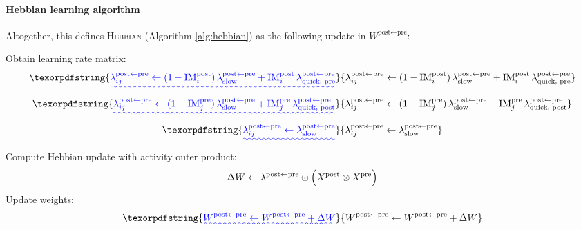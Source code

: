 \documentclass{article}
\providecommand{\DIFaddtex}[1]{{\protect\color{blue}\uwave{#1}}} %
\providecommand{\DIFaddbegin}{} %
\providecommand{\DIFaddend}{} %
\providecommand{\DIFadd}[1]{\texorpdfstring{\DIFaddtex{#1}}{#1}} %
\begin{document}
\paragraph*{Hebbian learning algorithm}
Altogether, this defines \textsc{Hebbian} (Algorithm \ref{alg:hebbian}) as the following update in $W^{\textrm{post} \leftarrow \textrm{pre}}$:
\begin{algorithm}
\caption[]{Hebbian Learning}\label{alg:hebbian}
\begin{algorithmic}[1]
 \DIFaddbegin {}
    \DIFaddend \State Obtain learning rate matrix:
    \DIFaddbegin {}
        \State \Return
    \EndIf
    \DIFaddend {}
         \DIFaddbegin \[
            \DIFadd{\lambda_{ij}^{\textrm{post} \leftarrow \textrm{pre}}
            \gets
            (1-\textrm{IM}^\textrm{post}_i)\,\lambda^{\textrm{post} \leftarrow \textrm{pre}}_\textrm{slow}
            + \textrm{IM}^\textrm{post}_i\,\lambda^{\textrm{post}\leftarrow\textrm{pre}}_{\textrm{quick, pre}}
        }\]\DIFaddend 
         \DIFaddbegin \[
            \DIFadd{\lambda_{ij}^{\textrm{post} \leftarrow \textrm{pre}}
            \gets
            (1-\textrm{IM}^\textrm{pre}_j)\,\lambda^{\textrm{post} \leftarrow \textrm{pre}}_\textrm{slow}
            + \textrm{IM}^\textrm{pre}_j\,\lambda^{\textrm{post}\leftarrow\textrm{pre}}_{\textrm{quick, post}}
        }\]\DIFaddend 
    \Else
         \DIFaddbegin \[
            \DIFadd{\lambda_{ij}^{\textrm{post} \leftarrow \textrm{pre}} 
            \gets 
            \lambda^{\textrm{post}\leftarrow\textrm{pre}}_\textrm{slow}
        }\]\DIFaddend 
    \EndIf
    \State Compute Hebbian update with activity outer product:
        \[
            \Delta W \gets \lambda^{\textrm{post} \leftarrow \textrm{pre}} \odot 
            \Bigl(X^{\textrm{post}} \otimes X^{\textrm{pre}}\Bigr)
        \]
    \State Update weights:
         \DIFaddbegin \[
            \DIFadd{W^{\textrm{post} \leftarrow \textrm{pre}} 
            \gets 
            W^{\textrm{post} \leftarrow \textrm{pre}} + \Delta W
        }\]\DIFaddend 
\EndFunction
\end{algorithmic}
\end{algorithm}
\end{document}
